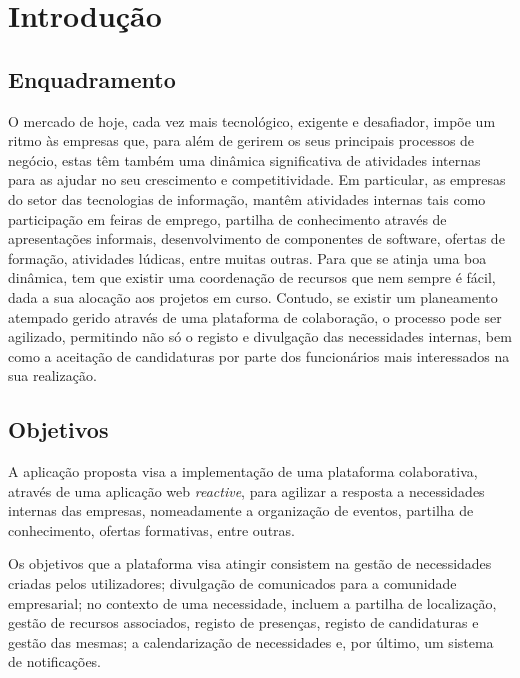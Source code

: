 \chapter{Introdução}\label{sec:intro}

\section{Enquadramento}\label{sec:enquadramento}
O mercado de hoje, cada vez mais tecnológico, exigente e desafiador, impõe um ritmo às empresas que, para
além de gerirem os seus principais processos de negócio, estas têm também uma dinâmica significativa de
atividades internas para as ajudar no seu crescimento e competitividade. Em particular, as empresas do setor
das tecnologias de informação, mantêm atividades internas tais como participação em feiras de emprego,
partilha de conhecimento através de apresentações informais, desenvolvimento de componentes de software,
ofertas de formação, atividades lúdicas, entre muitas outras. Para que se atinja uma boa dinâmica, tem que existir uma coordenação de
recursos que nem sempre é fácil, dada a sua alocação aos projetos em curso. Contudo, se existir um
planeamento atempado gerido através de uma plataforma de colaboração, o processo pode ser agilizado,
permitindo não só o registo e divulgação das necessidades internas, bem como a aceitação de candidaturas por
parte dos funcionários mais interessados na sua realização.

\section{Objetivos}\label{sec:objectivos}
A aplicação proposta visa a implementação de uma plataforma colaborativa, através de uma aplicação web \textit{reactive}, para agilizar a resposta a necessidades internas das empresas, nomeadamente a
organização de eventos, partilha de conhecimento, ofertas formativas, entre outras. 
\par

Os objetivos que a plataforma visa atingir consistem na gestão de necessidades criadas pelos utilizadores;
divulgação de comunicados para a comunidade empresarial;
no contexto de uma necessidade, incluem a partilha de localização, 
gestão de recursos associados, registo de presenças, registo de candidaturas e gestão das mesmas; 
a calendarização de necessidades e, por último, um sistema de notificações.

